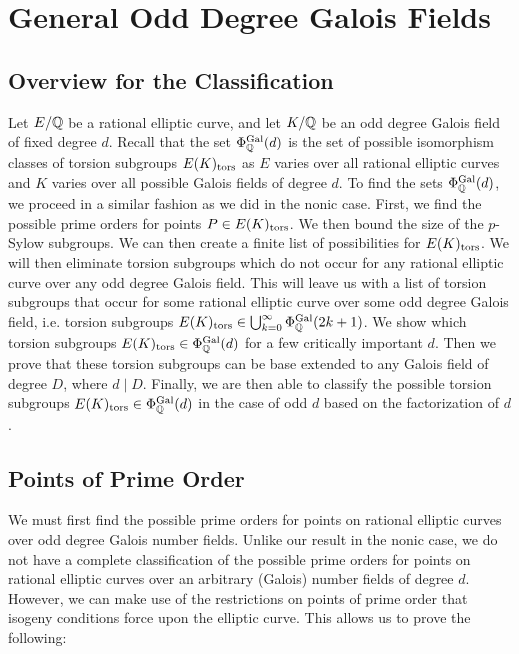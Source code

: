 \chapter{General Odd Degree Galois Fields}


\section{Overview for the Classification}

Let $E/\mathbb{Q}$ be a rational elliptic curve, and let $K/\mathbb{Q}$ be an odd degree Galois field of fixed degree $d$. Recall that the set $\Phi_{\mathbb{Q}}^{\operatorname{Gal}}(d)$ is the set of possible isomorphism classes of torsion subgroups $E(K)_{\text{tors}}$ as $E$ varies over all rational elliptic curves and $K$ varies over all possible Galois fields of degree $d$. To find the sets $\Phi_{\mathbb{Q}}^{\operatorname{Gal}}(d)$, we proceed in a similar fashion as we did in the nonic case. First, we find the possible prime orders for points $P \in E(K)_{\text{tors}}$. We then bound the size of the $p$-Sylow subgroups. We can then create a finite list of possibilities for $E(K)_{\text{tors}}$. We will then eliminate torsion subgroups which do not occur for any rational elliptic curve over any odd degree Galois field. This will leave us with a list of torsion subgroups that occur for some rational elliptic curve over some odd degree Galois field, i.e. torsion subgroups $E(K)_{\text{tors}} \in \bigcup_{k=0}^\infty \Phi_{\mathbb{Q}}^{\operatorname{Gal}}(2k+1)$. We show which torsion subgroups $E(K)_{\text{tors}} \in \Phi_{\mathbb{Q}}^{\operatorname{Gal}}(d)$ for a few critically important $d$. Then we prove that these torsion subgroups can be base extended to any Galois field of degree $D$, where $d \mid D$. Finally, we are then able to classify the possible torsion subgroups $E(K)_{\text{tors}} \in \Phi_{\mathbb{Q}}^{\operatorname{Gal}}(d)$ in the case of odd $d$ based on the factorization of $d$. 





\section{Points of Prime Order}

We must first find the possible prime orders for points on rational elliptic curves over odd degree Galois number fields. Unlike our result in the nonic case, we do not have a complete classification of the possible prime orders for points on rational elliptic curves over an arbitrary (Galois) number fields of degree $d$. However, we can make use of the restrictions on points of prime order that isogeny conditions force upon the elliptic curve. This allows us to prove the following:


